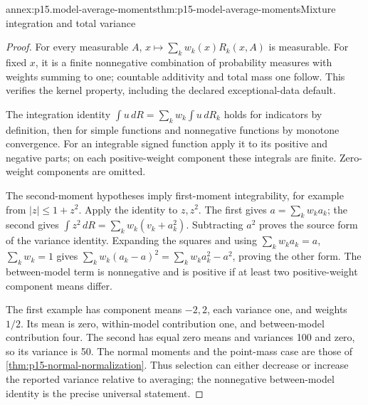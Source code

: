 \begin{annexitem}{annex:p15.model-average-moments}{thm:p15-model-average-moments}{Mixture integration and total variance}
\begin{proof}
For every measurable \(A\), \(x\mapsto\sum_kw_k(x)R_k(x,A)\) is
measurable. For fixed \(x\), it is a finite nonnegative combination of
probability measures with weights summing to one; countable additivity
and total mass one follow. This verifies the kernel property, including
the declared exceptional-data default.

The integration identity
\(\int u\,dR=\sum_kw_k\int u\,dR_k\) holds for indicators by definition,
then for simple functions and nonnegative functions by monotone convergence.
For an integrable signed function apply it to its positive and negative
parts; on each positive-weight component these integrals are finite.
Zero-weight components are omitted.

The second-moment hypotheses imply first-moment integrability, for example
from \(|z|\leq1+z^2\). Apply the identity to \(z,z^2\). The first gives
\(a=\sum_kw_ka_k\); the second gives
\(\int z^2\,dR=\sum_kw_k(v_k+a_k^2)\).
Subtracting \(a^2\) proves the source form of the variance identity.
Expanding the squares and using \(\sum_kw_ka_k=a\), \(\sum_kw_k=1\)
gives
\(\sum_kw_k(a_k-a)^2=\sum_kw_ka_k^2-a^2\), proving the other form.
The between-model term is nonnegative and is positive if at least two
positive-weight component means differ.

The first example has component means \(-2,2\), each variance one,
and weights \(1/2\). Its mean is zero, within-model contribution one,
and between-model contribution four. The second has equal zero means
and variances 100 and zero, so its variance is 50. The normal moments
and the point-mass case are those of \cref{thm:p15-normal-normalization}.
Thus selection can either decrease or increase the reported variance
relative to averaging; the nonnegative between-model identity is the
precise universal statement.
\end{proof}
\end{annexitem}

